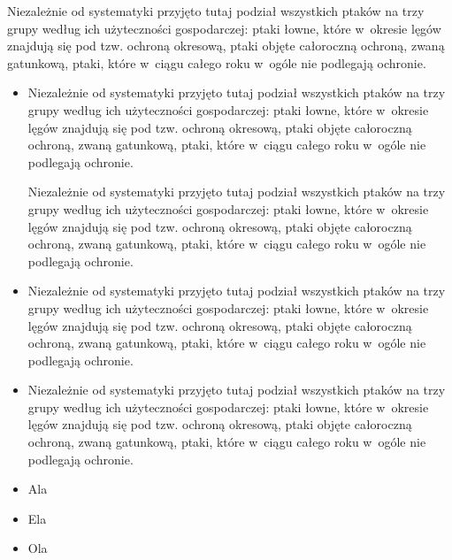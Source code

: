 \documentclass[a4paper,11pt]{article}
\begin{document}
Niezależnie od systematyki przyjęto tutaj podział wszystkich ptaków na trzy grupy według ich użyteczności gospodarczej: ptaki łowne, które w~okresie lęgów znajdują się pod tzw. ochroną okresową, ptaki objęte całoroczną ochroną, zwaną gatunkową, ptaki, które w~ciągu całego roku w~ogóle nie podlegają ochronie.

\begin{itemize}
\item Niezależnie od systematyki przyjęto tutaj podział wszystkich ptaków na trzy grupy według ich użyteczności gospodarczej: ptaki łowne, które w~okresie lęgów znajdują się pod tzw. ochroną okresową, ptaki objęte całoroczną ochroną, zwaną gatunkową, ptaki, które w~ciągu całego roku w~ogóle nie podlegają ochronie.

Niezależnie od systematyki przyjęto tutaj podział wszystkich ptaków na trzy grupy według ich użyteczności gospodarczej: ptaki łowne, które w~okresie lęgów znajdują się pod tzw. ochroną okresową, ptaki objęte całoroczną ochroną, zwaną gatunkową, ptaki, które w~ciągu całego roku w~ogóle nie podlegają ochronie.


\item Niezależnie od systematyki przyjęto tutaj podział wszystkich ptaków na trzy grupy według ich użyteczności gospodarczej: ptaki łowne, które w~okresie lęgów znajdują się pod tzw. ochroną okresową, ptaki objęte całoroczną ochroną, zwaną gatunkową, ptaki, które w~ciągu całego roku w~ogóle nie podlegają ochronie.

\item Niezależnie od systematyki przyjęto tutaj podział wszystkich ptaków na trzy grupy według ich użyteczności gospodarczej: ptaki łowne, które w~okresie lęgów znajdują się pod tzw. ochroną okresową, ptaki objęte całoroczną ochroną, zwaną gatunkową, ptaki, które w~ciągu całego roku w~ogóle nie podlegają ochronie.
\end{itemize}



\begin{itemize}
	\item Ala
	\item Ela
	\item Ola
\end{itemize}
\end{document}
